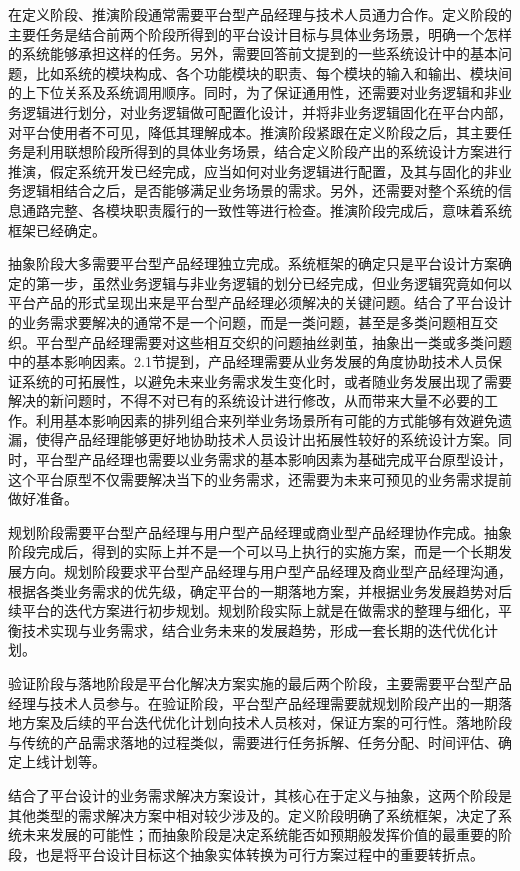 \documentclass[letterpaper,10pt,english]{sphinxmanual}
\begin{document}
在定义阶段、推演阶段通常需要平台型产品经理与技术人员通力合作。定义阶段的主要任务是结合前两个阶段所得到的平台设计目标与具体业务场景，明确一个怎样的系统能够承担这样的任务。另外，需要回答前文提到的一些系统设计中的基本问题，比如系统的模块构成、各个功能模块的职责、每个模块的输入和输出、模块间的上下位关系及系统调用顺序。同时，为了保证通用性，还需要对业务逻辑和非业务逻辑进行划分，对业务逻辑做可配置化设计，并将非业务逻辑固化在平台内部，对平台使用者不可见，降低其理解成本。推演阶段紧跟在定义阶段之后，其主要任务是利用联想阶段所得到的具体业务场景，结合定义阶段产出的系统设计方案进行推演，假定系统开发已经完成，应当如何对业务逻辑进行配置，及其与固化的非业务逻辑相结合之后，是否能够满足业务场景的需求。另外，还需要对整个系统的信息通路完整、各模块职责履行的一致性等进行检查。推演阶段完成后，意味着系统框架已经确定。

抽象阶段大多需要平台型产品经理独立完成。系统框架的确定只是平台设计方案确定的第一步，虽然业务逻辑与非业务逻辑的划分已经完成，但业务逻辑究竟如何以平台产品的形式呈现出来是平台型产品经理必须解决的关键问题。结合了平台设计的业务需求要解决的通常不是一个问题，而是一类问题，甚至是多类问题相互交织。平台型产品经理需要对这些相互交织的问题抽丝剥茧，抽象出一类或多类问题中的基本影响因素。2.1节提到，产品经理需要从业务发展的角度协助技术人员保证系统的可拓展性，以避免未来业务需求发生变化时，或者随业务发展出现了需要解决的新问题时，不得不对已有的系统设计进行修改，从而带来大量不必要的工作。利用基本影响因素的排列组合来列举业务场景所有可能的方式能够有效避免遗漏，使得产品经理能够更好地协助技术人员设计出拓展性较好的系统设计方案。同时，平台型产品经理也需要以业务需求的基本影响因素为基础完成平台原型设计，这个平台原型不仅需要解决当下的业务需求，还需要为未来可预见的业务需求提前做好准备。

规划阶段需要平台型产品经理与用户型产品经理或商业型产品经理协作完成。抽象阶段完成后，得到的实际上并不是一个可以马上执行的实施方案，而是一个长期发展方向。规划阶段要求平台型产品经理与用户型产品经理及商业型产品经理沟通，根据各类业务需求的优先级，确定平台的一期落地方案，并根据业务发展趋势对后续平台的迭代方案进行初步规划。规划阶段实际上就是在做需求的整理与细化，平衡技术实现与业务需求，结合业务未来的发展趋势，形成一套长期的迭代优化计划。

验证阶段与落地阶段是平台化解决方案实施的最后两个阶段，主要需要平台型产品经理与技术人员参与。在验证阶段，平台型产品经理需要就规划阶段产出的一期落地方案及后续的平台迭代优化计划向技术人员核对，保证方案的可行性。落地阶段与传统的产品需求落地的过程类似，需要进行任务拆解、任务分配、时间评估、确定上线计划等。

结合了平台设计的业务需求解决方案设计，其核心在于定义与抽象，这两个阶段是其他类型的需求解决方案中相对较少涉及的。定义阶段明确了系统框架，决定了系统未来发展的可能性；而抽象阶段是决定系统能否如预期般发挥价值的最重要的阶段，也是将平台设计目标这个抽象实体转换为可行方案过程中的重要转折点。
\end{document}
